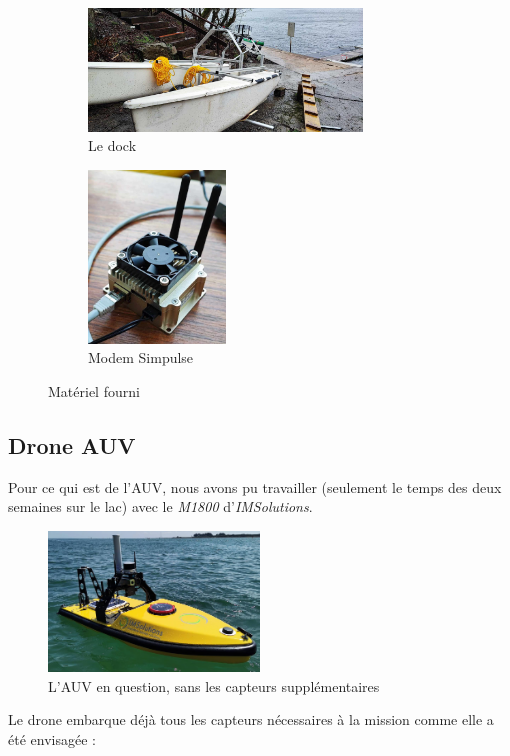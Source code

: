 \documentclass[12pt]{report}
\begin{document}
\begin{figure}[H]
    \begin{subfigure}{0.45\textwidth}
        \centering
        \includegraphics[width=0.8\textwidth]{imgs/dock.jpg}
        \caption{Le dock}
        \label{fig:dock}
    \end{subfigure}
    \begin{subfigure}{0.4\textwidth}
        \centering
        \includegraphics[width=0.4\textwidth]{imgs/simpulse.jpg}
        \caption{Modem Simpulse}
        \label{fig:simpulse}
    \end{subfigure}
    \caption{Matériel fourni}
\end{figure}

\subsection{Drone AUV}
Pour ce qui est de l'AUV, nous avons pu travailler (seulement le temps des deux semaines sur le lac) avec le \textit{M1800} d'\textit{IMSolutions}.
\begin{figure}[H]
    \centering
    \includegraphics[width=0.5\textwidth]{imgs/monodrone-1800-chenal.jpg}
    \caption{L'AUV en question, sans les capteurs supplémentaires}
\end{figure}
Le drone embarque déjà tous les capteurs nécessaires à la mission comme elle a été envisagée :
\end{document}
